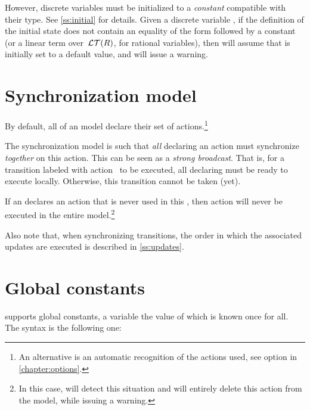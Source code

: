 However, discrete variables must be initialized to a \emph{constant} compatible with their type.
See \cref{ss:initial} for details.
Given a discrete variable , if the definition of the initial state does not contain an equality of the form  followed by a constant (or a linear term over~$\mathcal{LT}(R)$, for rational variables), then \imitator{} will assume that  is initially set to a default value, and will issue a warning.



\section{Synchronization model}\label{sect:synchronization}

By default, all \IPTA{} of an \imitator{} model declare their set of actions.\footnote{%
	An alternative is an automatic recognition of the actions used, see option  in \cref{chapter:options}.
}

The \imitator{} synchronization model is such that \emph{all} \IPTA{} declaring an action must synchronize \emph{together} on this action.
This can be seen as a \emph{strong broadcast}.
That is, for a transition labeled with action~ to be executed, all \IPTA{} declaring  must be ready to execute  locally.
Otherwise, this transition cannot be taken (yet).

If an \IPTA{} declares an action  that is never used in this \IPTA{}, then action  will never be executed in the entire model.\footnote{%
	In this case, \imitator{} will detect this situation and will entirely delete this action from the model, while issuing a warning.
}

Also note that, when synchronizing transitions, the order in which the associated updates are executed is described in \cref{ss:updates}.


\section{Global constants}

\imitator{} supports global constants, \ie{} a variable the value of which is known once for all.
The syntax is the following one:

